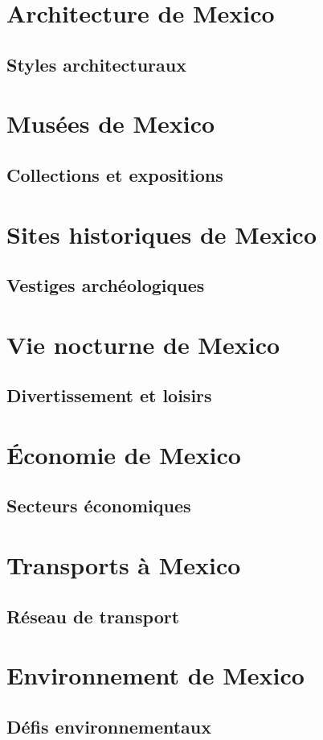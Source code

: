 \documentclass[12pt, a4paper]{article}
\begin{document}
\section{Architecture de Mexico}
\subsection{Styles architecturaux}
\section{Musées de Mexico}
\subsection{Collections et expositions}
\section{Sites historiques de Mexico}
\subsection{Vestiges archéologiques}
\section{Vie nocturne de Mexico}
\subsection{Divertissement et loisirs}
\section{Économie de Mexico}
\subsection{Secteurs économiques}
\section{Transports à Mexico}
\subsection{Réseau de transport}
\section{Environnement de Mexico}
\subsection{Défis environnementaux}
\end{document}
